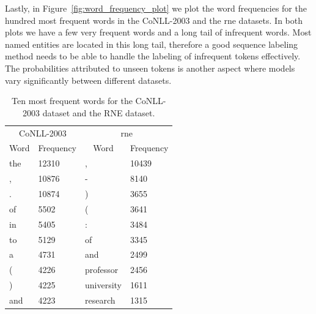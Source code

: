 \documentclass{nle}
\begin{document}
Lastly, in Figure~\ref{fig:word_frequency_plot}
we plot the word frequencies for the hundred most frequent words in the {CoNLL-2003} and 
the \gls{rne} datasets. In both plots we have a few very frequent words and a long tail of
infrequent words. Most named entities are located in this long tail, therefore a good sequence
labeling method needs to be able to handle the labeling of infrequent tokens effectively. 
The probabilities attributed to unseen tokens is another aspect where models vary significantly 
between different datasets.


\begin{table}[h]
  \small
  \begin{center}
    \begin{tabular}{ llll }
      \toprule
      \multicolumn{2}{c}{CoNLL-2003} & \multicolumn{2}{c}{\gls{rne}} \\
      \multicolumn{1}{c}{Word} & \multicolumn{1}{c}{Frequency} &
      \multicolumn{1}{c}{Word} & \multicolumn{1}{c}{Frequency} \\
      \midrule
      the & 12310 & , & 10439      \\
      , & 10876 & - & 8140         \\
      . & 10874 & ) & 3655         \\
      of & 5502 & ( & 3641         \\
      in & 5405 & : & 3484         \\
      to & 5129 & of & 3345        \\
      a & 4731 & and & 2499        \\
      ( & 4226 & professor & 2456  \\
      ) & 4225 & university & 1611 \\
      and & 4223 & research & 1315 \\
      \bottomrule
    \end{tabular}
  \end{center}
  \caption{Ten most frequent words for the {CoNLL-2003} dataset and the RNE dataset.}
  \label{tab:frequent_words}
\end{table}
\end{document}
